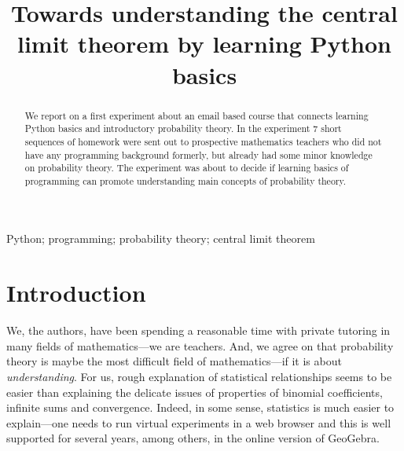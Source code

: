 \documentclass[]{interact}
\theoremstyle{plain}%
\theoremstyle{definition}
\theoremstyle{remark}
\begin{document}

\title{Towards understanding the central limit theorem by learning Python basics}

\author{
}

\maketitle

\begin{abstract}

We report on a first experiment about an email based course that connects learning
Python basics and introductory probability theory. In the experiment 7 short sequences
of homework were sent out to prospective mathematics teachers who did not have
any programming background formerly, but already had some minor knowledge on probability theory.
The experiment was about to decide if learning basics of programming can promote
understanding main concepts of probability theory.
\end{abstract}

\begin{keywords}
Python; programming; probability theory; central limit theorem
\end{keywords}

\section{Introduction}

We, the authors, have been spending a reasonable time with private tutoring in many fields
of mathematics---we are teachers. And, we agree on that probability theory is maybe
the most difficult field of mathematics---if it is about \textit{understanding}. For us, rough explanation
of statistical relationships seems to be easier than explaining the delicate issues
of properties of binomial coefficients, infinite sums and convergence. Indeed, in some
sense, statistics is much easier to explain---one needs to run virtual experiments
in a web browser %
and this is well supported for several years, among others, in the online version of GeoGebra.
\end{document}
